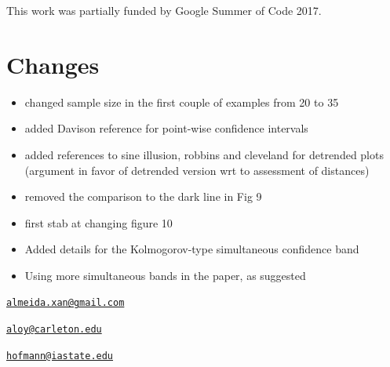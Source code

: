 This work was partially funded by Google Summer of Code 2017.

\hypertarget{changes}{%
\section{Changes}\label{changes}}

\begin{itemize}
\tightlist
\item
  changed sample size in the first couple of examples from 20 to 35
\item
  added Davison reference for point-wise confidence intervals
\item
  added references to sine illusion, robbins and cleveland for detrended
  plots (argument in favor of detrended version wrt to assessment of
  distances)
\item
  removed the comparison to the dark line in Fig 9
\item
  first stab at changing figure 10
\item
  Added details for the Kolmogorov-type simultaneous confidence band
\item
  Using more simultaneous bands in the paper, as suggested
\end{itemize}

\address{%
Alexandre Almeida\\
University of Campinas\\
Institute of Computing\\ Campinas, Brazil 13083-852\\
}
\href{mailto:almeida.xan@gmail.com}{\nolinkurl{almeida.xan@gmail.com}}

\address{%
Adam Loy\\
Carleton College\\
Department of Mathematics and Statistics\\ Northfield, MN 55057\\
}
\href{mailto:aloy@carleton.edu}{\nolinkurl{aloy@carleton.edu}}

\address{%
Heike Hofmann\\
Iowa State University\\
Department of Statistics\\ Ames, IA 50011-1210\\
}
\href{mailto:hofmann@iastate.edu}{\nolinkurl{hofmann@iastate.edu}}


